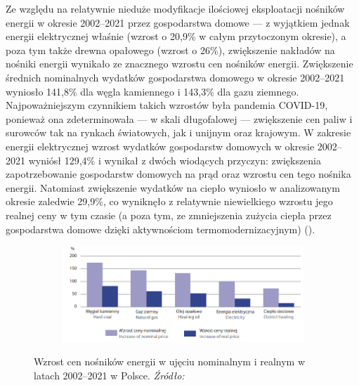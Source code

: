 \documentclass[polish, twoside, 12pt, a4paper]{article}
\theoremstyle{definition}
\theoremstyle{plain}
\theoremstyle{remark}
\begin{document}
Ze względu na relatywnie nieduże modyfikacje ilościowej eksploatacji nośników energii w okresie 2002--2021 przez gospodarstwa domowe --- z wyjątkiem jednak energii elektrycznej właśnie (wzrost o 20,9\% w całym przytoczonym okresie), a poza tym także drewna opałowego (wzrost o 26\%), zwiększenie nakładów na nośniki energii wynikało ze znacznego wzrostu cen nośników energii. Zwiększenie średnich nominalnych wydatków gospodarstwa domowego w okresie 2002--2021 wyniosło 141,8\% dla węgla kamiennego i 143,3\% dla gazu ziemnego. Najpoważniejszym czynnikiem takich wzrostów była pandemia COVID-19, ponieważ ona zdeterminowała --- w skali długofalowej --- zwiększenie cen paliw i surowców tak na rynkach światowych, jak i unijnym oraz krajowym. W zakresie energii elektrycznej wzrost wydatków gospodarstw domowych w okresie 2002--2021 wyniósł 129,4\% i wynikał z dwóch wiodących przyczyn: zwiększenia zapotrzebowanie gospodarstw domowych na prąd oraz wzrostu cen tego nośnika energii. Natomiast zwiększenie wydatków na ciepło wyniosło w analizowanym okresie zaledwie 29,9\%, co wyniknęło z relatywnie niewielkiego wzrostu jego realnej ceny w tym czasie (a poza tym, ze zmniejszenia zużycia ciepła przez gospodarstwa domowe dzięki aktywnościom termomodernizacyjnym) (\cite{gus2023}). 

\begin{figure}[hbt]
  \centering

  \begin{subfigure}[t]{0.45\textwidth}
    \hspace{-1.7cm}
    \includegraphics[width=1.43\textwidth]{./out_figures/figure_10}
  \end{subfigure}

  \captionsetup{margin=10pt,font=small,labelfont=bf,width=.8\textwidth}

  \caption[Wzrost cen nośników energii w ujęciu nominalnym i realnym w latach 2002--2021 w Polsce.]{Wzrost cen nośników energii w ujęciu nominalnym i realnym w latach 2002--2021 w Polsce. \textit{Źródło:} \cite{gus2023}}\label{fig:x10}
\end{figure}
\end{document}
